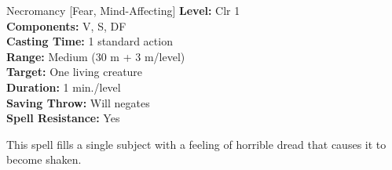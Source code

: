 {Necromancy [Fear, Mind-Affecting]}
{
	\textbf{Level:}
	Clr 1\\
	\textbf{Components:}
	V, S, DF\\
	\textbf{Casting Time:}
	1 standard action\\
	\textbf{Range:}
	Medium (30 m + 3 m/level)\\
	\textbf{Target:}
	One living creature\\
	\textbf{Duration:}
	1 min./level\\
	\textbf{Saving Throw:}
	Will negates\\
	\textbf{Spell Resistance:}
	Yes\\
}
{
	This spell fills a single subject with a feeling of horrible dread that causes it to become shaken.

}
